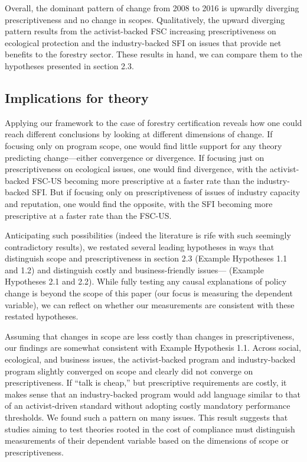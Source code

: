 \documentclass[
      12pt,
            Review ]{article}
\begin{document}
Overall, the dominant pattern of change from 2008 to 2016 is upwardly
diverging prescriptiveness and no change in scopes. Qualitatively, the
upward diverging pattern results from the activist-backed FSC increasing
prescriptiveness on ecological protection and the industry-backed SFI on
issues that provide net benefits to the forestry sector. These results
in hand, we can compare them to the hypotheses presented in section 2.3.

\subsection{Implications for theory}\label{implications-for-theory}

Applying our framework to the case of forestry certification reveals how
one could reach different conclusions by looking at different dimensions
of change. If focusing only on program scope, one would find little
support for any theory predicting change---either convergence or
divergence. If focusing just on prescriptiveness on ecological issues,
one would find divergence, with the activist-backed FSC-US becoming more
prescriptive at a faster rate than the industry-backed SFI. But if
focusing only on prescriptiveness of issues of industry capacity and
reputation, one would find the opposite, with the SFI becoming more
prescriptive at a faster rate than the FSC-US.

Anticipating such possibilities (indeed the literature is rife with such
seemingly contradictory results), we restated several leading hypotheses
in ways that distinguish scope and prescriptiveness in section 2.3
(Example Hypotheses 1.1 and 1.2) and distinguish costly and
business-friendly issues--- (Example Hypotheses 2.1 and 2.2). While
fully testing any causal explanations of policy change is beyond the
scope of this paper (our focus is measuring the dependent variable), we
can reflect on whether our measurements are consistent with these
restated hypotheses.

Assuming that changes in scope are less costly than changes in
prescriptiveness, our findings are somewhat consistent with Example
Hypothesis 1.1. Across social, ecological, and business issues, the
activist-backed program and industry-backed program slightly converged
on scope and clearly did not converge on prescriptiveness. If ``talk is
cheap,'' but prescriptive requirements are costly, it makes sense that
an industry-backed program would add language similar to that of an
activist-driven standard without adopting costly mandatory performance
thresholds. We found such a pattern on many issues. This result suggests
that studies aiming to test theories rooted in the cost of compliance
must distinguish measurements of their dependent variable based on the
dimensions of scope or prescriptiveness.
\end{document}
